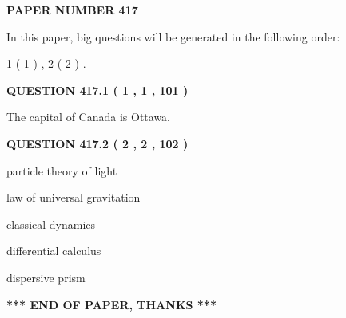 \documentclass[12pt]{article}
\begin{document}
   
   
   
\newpage 
\setcounter{page}{ 
   417001 } 
   
   
   
   
 {\textbf{ \Large{ PAPER NUMBER  417  }}}
   
   
\vspace{0.2in}
   
   
   
   
   
\vspace{0.2in}
   
In this paper, big questions will be generated in the following order: 
   
   
   1 ( 1 )
 ,
   2 ( 2 )
 .
  
\vspace{0.2in}
  
{\textbf{\Large{QUESTION
417.1 
 ( 1 , 1 , 101 )
}}}
  
  
 
 
\noindent{}
 
 
The capital of Canada is Ottawa.
 
 
 
 
  
\vspace{0.2in}
  
{\textbf{\Large{QUESTION
417.2 
 ( 2 , 2 , 102 )
}}}
  
  
 
 
\noindent{}
 
 
particle theory of light
 
 
law of universal gravitation
 
 
classical dynamics
 
 
differential calculus
 
 
dispersive prism
 
 
 
 
   
   
\vspace{1.0in} 
{\textbf{\large{ *** END OF PAPER, THANKS *** }}} 
   
\end{document}
